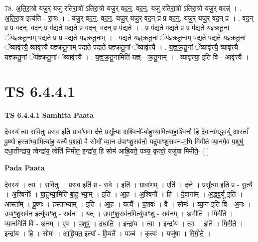 \documentclass[17pt]{extarticle}
\begin{document}
78. अ॒ति॒रा॒त्रो यजु॒र् यजु॑ रतिरा॒त्रो॑ ऽतिरा॒त्रो यजु॒र् वद॒न्॒. वद॒न्॒. यजु॑ रतिरा॒त्रो॑ ऽतिरा॒त्रो यजु॒र् वदन्न्॑ । . अ॒ति॒रा॒त्र इत्य॑ति - रा॒त्रः । . यजु॒र् वद॒न्॒. वद॒न्॒. यजु॒र् यजु॒र् वद॒न् प्र प्र वद॒न्॒. यजु॒र् यजु॒र् वद॒न् प्र । . वद॒न् प्र प्र वद॒न्॒. वद॒न् प्र प॑द्यते पद्यते॒ प्र वद॒न्॒. वद॒न् प्र प॑द्यते । . प्र प॑द्यते पद्यते॒ प्र प्र प॑द्यते यज्ञ्क्रतू॒नां ॅय॑ज्ञ्क्रतू॒नाम् प॑द्यते॒ प्र प्र प॑द्यते यज्ञ्क्रतू॒नाम् । . प॒द्य॒ते॒ य॒ज्ञ्॒क्र॒तू॒नां ॅय॑ज्ञ्क्रतू॒नाम् प॑द्यते पद्यते यज्ञ्क्रतू॒नां ॅव्यावृ॑त्त्यै॒ व्यावृ॑त्त्यै यज्ञ्क्रतू॒नाम् प॑द्यते पद्यते यज्ञ्क्रतू॒नां ॅव्यावृ॑त्त्यै । . य॒ज्ञ्॒क्र॒तू॒नां ॅव्यावृ॑त्त्यै॒ व्यावृ॑त्त्यै यज्ञ्क्रतू॒नां ॅय॑ज्ञ्क्रतू॒नां ॅव्यावृ॑त्त्यै । . य॒ज्ञ्॒क्र॒तू॒नामिति॑ यज्ञ् - क्र॒तू॒नाम् । . व्यावृ॑त्त्या॒ इति॑ वि - आवृ॑त्त्यै । \newline
\pagebreak
{}

\section{ TS 6.4.4.1 }

\textbf{TS 6.4.4.1 } \newline
\textbf{Samhita Paata} \newline

दे॒वस्य॑ त्वा सवि॒तुः प्रस॑व॒ इति॒ ग्रावा॑ण॒मा द॑त्ते॒ प्रसू᳚त्या अ॒श्विनो᳚-र्बा॒हुभ्या॒मित्या॑हा॒श्विनौ॒ हि दे॒वाना॑मद्ध्व॒र्यू आस्तां᳚ पू॒ष्णो हस्ता᳚भ्या॒मित्या॑ह॒ यत्यै॑ प॒शवो॒ वै सोमो᳚ व्या॒न उ॑पाꣳशु॒सव॑नो॒ यदु॑पाꣳशु॒सव॑न-म॒भि मिमी॑ते व्या॒नमे॒व प॒शुषु॑ दधा॒तीन्द्रा॑य॒ त्वेन्द्रा॑य॒ त्वेति॑ मिमीत॒ इन्द्रा॑य॒ हि सोम॑ आह्रि॒यते॒ पञ्च॒ कृत्वो॒ यजु॑षा मिमीते॒- [  ] \newline

\textbf{Pada Paata} \newline

दे॒वस्य॑ । त्वा॒ । स॒वि॒तुः । प्र॒स॒व इति॑ प्र - स॒वे । इति॑ । ग्रावा॑णम् । एति॑ । द॒त्ते॒ । प्रसू᳚त्या॒ इति॒ प्र - सू॒त्यै॒ । अ॒श्विनोः᳚ । बा॒हुभ्या॒मिति॑ बा॒हु-भ्या॒म् । इति॑ । आ॒ह॒ । अ॒श्विनौ᳚ । हि । दे॒वाना᳚म् । अ॒द्ध्व॒र्यू इति॑ । आस्ता᳚म् । पू॒ष्णः । हस्ता᳚भ्याम् । इति॑ । आ॒ह॒ । यत्यै᳚ । प॒शवः॑ । वै । सोमः॑ । व्या॒न इति॑ वि - अ॒नः । उ॒पाꣳ॒॒शु॒सव॑न॒ इत्यु॑पाꣳशु - सव॑नः । यत् । उ॒पाꣳ॒॒शु॒सव॑न॒मित्यु॑पाꣳशु - सव॑नम् । अ॒भीति॑ । मिमी॑ते । व्या॒नमिति॑ वि - अ॒नम् । ए॒व । प॒शुषु॑ । द॒धा॒ति॒ । इन्द्रा॑य । त्वा॒ । इन्द्रा॑य । त्वा॒ । इति॑ । मि॒मी॒ते॒ । इन्द्रा॑य । हि । सोमः॑ । आ॒ह्रि॒यत॒ इत्या᳚ - ह्रि॒यते᳚ । पञ्च॑ । कृत्वः॑ । यजु॑षा । मि॒मी॒ते॒ ।  \newline
\end{document}
